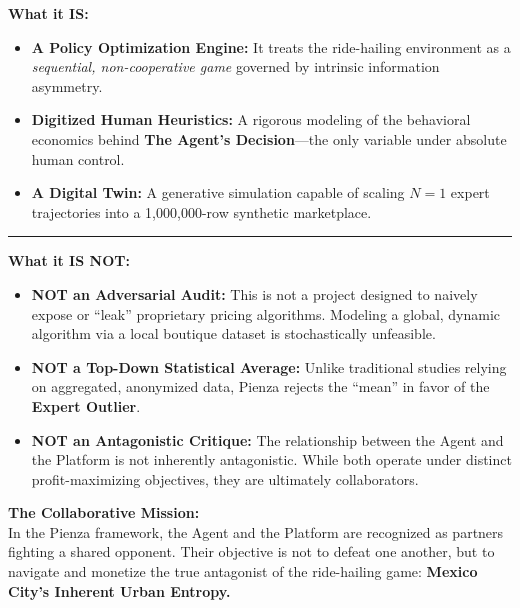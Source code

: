 \begin{tcolorbox}[colback=white, colframe=black, arc=0mm, title=\sffamily \textbf{THE DEFINITION OF PIENZA}]
    \rmfamily
    \textbf{What it IS:}
    \begin{itemize}[noitemsep, topsep=2pt, leftmargin=1.5em]
        \item \textbf{A Policy Optimization Engine:} It treats the ride-hailing environment as a \textit{sequential, non-cooperative game} governed by intrinsic information asymmetry.
        \item \textbf{Digitized Human Heuristics:} A rigorous modeling of the behavioral economics behind \textbf{The Agent’s Decision}---the only variable under absolute human control.
        \item \textbf{A Digital Twin:} A generative simulation capable of scaling $N=1$ expert trajectories into a 1,000,000-row synthetic marketplace.
    \end{itemize}
    
    \vspace{2mm}
    \hrule
    \vspace{2mm}
    
    \textbf{What it IS NOT:}
    \begin{itemize}[noitemsep, topsep=2pt, leftmargin=1.5em]
        \item \textbf{NOT an Adversarial Audit:} This is not a project designed to naively expose or ``leak'' proprietary pricing algorithms. Modeling a global, dynamic algorithm via a local boutique dataset is stochastically unfeasible.
        \item \textbf{NOT a Top-Down Statistical Average:} Unlike traditional studies relying on aggregated, anonymized data, Pienza rejects the ``mean'' in favor of the \textbf{Expert Outlier}.
        \item \textbf{NOT an Antagonistic Critique:} The relationship between the Agent and the Platform is not inherently antagonistic. While both operate under distinct profit-maximizing objectives, they are ultimately collaborators.
    \end{itemize}
\end{tcolorbox}

\vspace{0.5cm}

\noindent \textbf{The Collaborative Mission:} \\
In the Pienza framework, the Agent and the Platform are recognized as partners fighting a shared opponent. Their objective is not to defeat one another, but to navigate and monetize the true antagonist of the ride-hailing game: \textbf{Mexico City’s Inherent Urban Entropy.}

